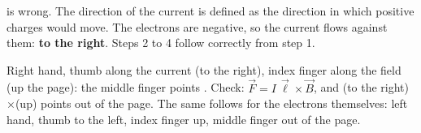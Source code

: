 \begin{abcliste}
\abc {} is wrong. The direction of the current is defined as the direction in which positive charges would move. The electrons are negative, so the current flows against them: \textbf{to the right}. Steps 2 to 4 follow correctly from step 1.

\abc Right hand, thumb along the current (to the right), index finger along the field (up the page): the middle finger points . Check: $\vec F = I\,\vec\ell\times\vec B$, and (to the right)$\times$(up) points out of the page. The same follows for the electrons themselves: left hand, thumb to the left, index finger up, middle finger out of the page.
\end{abcliste}

